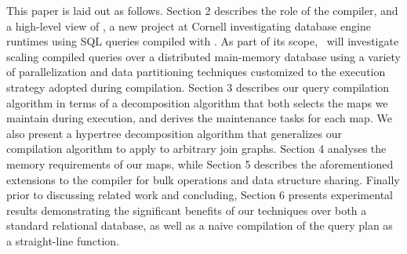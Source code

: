 This paper is laid out as follows. Section 2 describes the role of the compiler,
and a high-level view of \project, a new project at Cornell investigating
database engine runtimes using SQL queries compiled with \compiler. As part of
its scope, \project\ will investigate scaling compiled queries over a distributed
main-memory database using a variety of parallelization and data partitioning
techniques customized to the execution strategy adopted during compilation.
Section 3 describes our query compilation algorithm in terms of a decomposition
algorithm that both selects the maps we maintain during execution, and derives
the maintenance tasks for each map. We also present a hypertree decomposition
algorithm that generalizes our compilation algorithm to apply to arbitrary join
graphs. Section 4 analyses the memory requirements of our maps, while Section 5
describes the aforementioned extensions to the compiler for bulk operations and
data structure sharing. Finally prior to discussing related work and concluding,
Section 6 presents experimental results demonstrating the significant benefits of
our techniques over both a standard relational database, as well as a naive
compilation of the query plan as a straight-line function.


